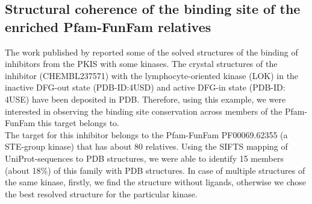 \documentclass[a4paper, 11pt]{article}
\begin{document}
\subsection*{Structural coherence of the binding site of the enriched Pfam-FunFam relatives}
The work published by \cite{elkins2016comprehensive} reported some of the solved structures of the binding of inhibitors from the PKIS with some kinases. The crystal structures of the inhibitor (CHEMBL237571) with the lymphocyte-oriented kinase (LOK) in the inactive DFG-out state (PDB-ID:4USD) and active DFG-in state (PDB-ID: 4USE) have been deposited in PDB. Therefore, using this example, we were interested in observing the binding site conservation across members of the Pfam-FunFam this target belongs to.\\
The target for this inhibitor belongs to the Pfam-FunFam PF00069.62355 (a STE-group kinase) that has about 80 relatives. Using the SIFTS mapping of UniProt-sequences to PDB structures, we were able to identify 15 members (about 18\%) of this family with PDB structures. In case of multiple structures of the same kinase, firstly, we find the structure without ligands, otherwise we chose the best resolved structure for the particular kinase.\\
\end{document}
